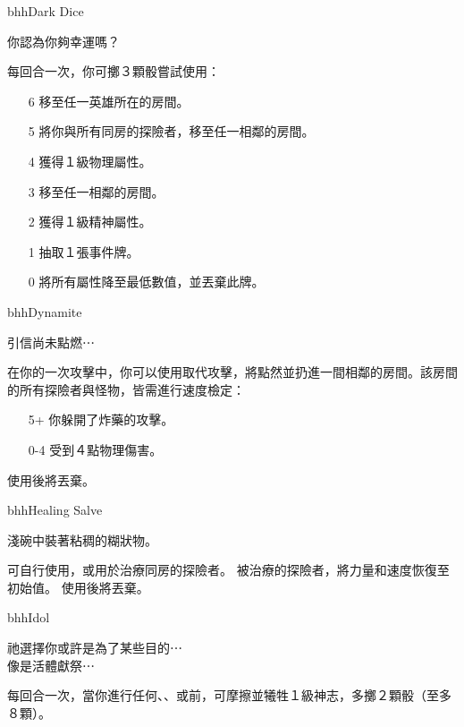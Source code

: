 \begin{ItemCard}{bhh}{Dark Dice}{}
  \begin{CardStory}
    你認為你夠幸運嗎？
  \end{CardStory}
  每回合一次，你可擲３顆骰嘗試使用\ThisName{}：
  \begin{itemize}
    \item[6] 移至任一英雄所在的房間。
    \item[5] 將你與所有同房的探險者，移至任一相鄰的房間。
    \item[4] 獲得１級物理屬性。
    \item[3] 移至任一相鄰的房間。
    \item[2] 獲得１級精神屬性。
    \item[1] 抽取１張事件牌。
    \item[0] 將所有屬性降至最低數值，並丟棄此牌。
  \end{itemize}
\end{ItemCard}%
\linebreak[0]%
\begin{ItemCard}{bhh}{Dynamite}{}
  \begin{CardStory}
    引信尚未點燃⋯
  \end{CardStory}
  在你的一次攻擊中，你可以使用\ThisName{}取代攻擊，將\ThisName{}點然並扔進一間相鄰的房間。該房間的所有探險者與怪物，皆需進行速度檢定：
  \begin{itemize}
    \item[5+] 你躲開了炸藥的攻擊。
    \item[0-4] 受到４點物理傷害。
  \end{itemize}
  使用後將\ThisName{}丟棄。\smallbreak
\end{ItemCard}%
\linebreak[0]%
\begin{ItemCard}{bhh}{Healing Salve}{}
  \begin{CardStory}
    淺碗中裝著粘稠的糊狀物。
  \end{CardStory}
  可自行使用，或用於治療同房的探險者。\smallbreak
  被\ThisName{}治療的探險者，將力量和速度恢復至初始值。\smallbreak
  使用後將\ThisName{}丟棄。\smallbreak
\end{ItemCard}%
\linebreak[0]%
\begin{ItemCard}{bhh}{Idol}{}
  \begin{CardStory}
    祂選擇你或許是為了某些目的⋯\\
    像是活體獻祭⋯
  \end{CardStory}
  每回合一次，當你進行任何、、或前，可摩擦\ThisName{}並犧牲１級神志，多擲２顆骰（至多８顆）。\smallbreak
\end{ItemCard}%
